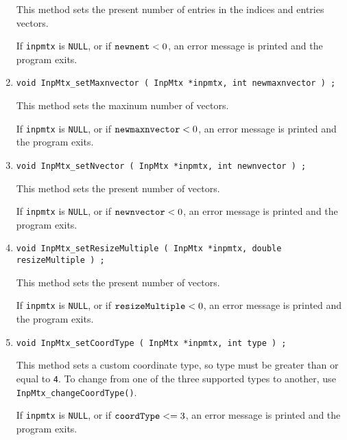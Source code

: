 \begin{enumerate}
This method sets the present number of entries in the indices and
entries vectors.
\par {}
If {\tt inpmtx} is {\tt NULL}, or if ${\tt newnent} < 0$,
an error message is printed and the program exits.
\item
\begin{verbatim}
void InpMtx_setMaxnvector ( InpMtx *inpmtx, int newmaxnvector ) ;
\end{verbatim}
This method sets the maxinum number of vectors.
\par {}
If {\tt inpmtx} is {\tt NULL}, or if ${\tt newmaxnvector} < 0$,
an error message is printed and the program exits.
\item
\begin{verbatim}
void InpMtx_setNvector ( InpMtx *inpmtx, int newnvector ) ;
\end{verbatim}
This method sets the present number of vectors.
\par {}
If {\tt inpmtx} is {\tt NULL}, or if ${\tt newnvector} < 0$,
an error message is printed and the program exits.
\item
\begin{verbatim}
void InpMtx_setResizeMultiple ( InpMtx *inpmtx, double resizeMultiple ) ;
\end{verbatim}
This method sets the present number of vectors.
\par {}
If {\tt inpmtx} is {\tt NULL}, or if ${\tt resizeMultiple} < 0$,
an error message is printed and the program exits.
\item
\begin{verbatim}
void InpMtx_setCoordType ( InpMtx *inpmtx, int type ) ;
\end{verbatim}
This method sets a custom coordinate type, so type must be greater
than or equal to {\tt 4}.
To change from one of the three supported types to another,
use {\tt InpMtx\_changeCoordType()}.
\par {}
If {\tt inpmtx} is {\tt NULL}, or if ${\tt coordType} <= 3$,
an error message is printed and the program exits.
\end{enumerate}
\par
